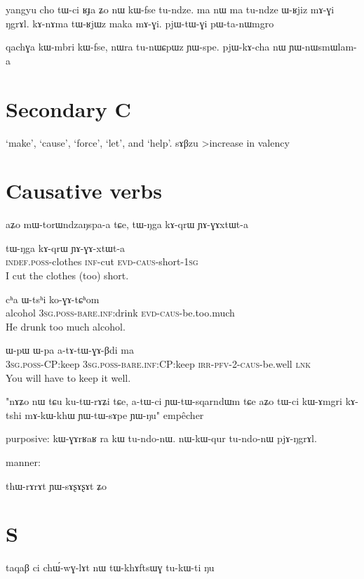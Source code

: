 \documentclass[oldfontcommands,oneside,a4paper,11pt]{article}
\newcommand{\ipa}[1]{{\phon #1}} %
\begin{document}
yangyu cho tɯ-ci ʁɟa ʑo nɯ kɯ-fse tu-ndze.
ma nɯ ma tu-ndze ɯ-ʁjiz mɤ-ɣi ŋgrɤl.
kɤ-nɤma tɯ-ʁjɯz maka mɤ-ɣi.
pjɯ-tɯ-ɣi pɯ-ta-nɯmgro

qachɣa kɯ-mbri kɯ-fse, nɯra tu-nɯɕpɯz ɲɯ-spe. 
pjɯ-kɤ-cha nɯ ɲɯ-nɯsmɯlam-a
  \section{Secondary C} 
‘make’, ‘cause’, ‘force’, ‘let’, and ‘help’.
sɤβzu
>increase in valency
\section{Causative verbs}
aʑo mɯ-torɯndzaŋspa-a tɕe, tɯ-ŋga kɤ-qrɯ ɲɤ-ɣɤxtɯt-a



 \begin{exe}
\ex \label{ex:GAxtWt}
\gll
\ipa{tɯ-ŋga}  	\ipa{kɤ-qrɯ}  	\ipa{ɲɤ-ɣɤ-xtɯt-a}  \\
\textsc{indef.poss}-clothes \textsc{inf}-cut \textsc{evd-caus}-short-\textsc{1sg}\\
 \glt I cut the clothes (too) short.
\end{exe}

 \begin{exe}
\ex \label{ex:koGAtChom}
\gll
\ipa{cʰa} \ipa{ɯ-tsʰi} \ipa{ko-ɣɤ-tɕʰom} \\
alcohol \textsc{3sg.poss}-\textsc{bare.inf}:drink \textsc{evd-caus}-be.too.much \\
\glt He drunk too much alcohol.
\end{exe}
 \begin{exe}
\ex \label{ex:atAtWGABdi}
\gll
\ipa{ɯ-pɯ}  	\ipa{ɯ-pa}  	\ipa{a-tɤ-tɯ-ɣɤ-βdi}  	\ipa{ma}  \\
\textsc{3sg.poss}-CP:keep \textsc{3sg.poss}-\textsc{bare.inf}:CP:keep \textsc{irr-pfv-2-caus}-be.well \textsc{lnk} \\
\glt You will have to keep it well.
\end{exe}


"nɤʑo nɯ tɕu ku-tɯ-rɤʑi tɕe, a-tɯ-ci ɲɯ-tɯ-sqarndɯm tɕe aʑo
tɯ-ci kɯ-ɤmgri kɤ-tshi mɤ-kɯ-khɯ ɲɯ-tɯ-sɤpe ɲɯ-ŋu"
empêcher

purposive:
kɯ-ɣɤrʁaʁ ra kɯ tu-ndo-nɯ.
nɯ-kɯ-qur tu-ndo-nɯ pjɤ-ŋgrɤl.

  
 
manner:

thɯ-rɤrɤt ɲɯ-sɤʂɤʂɤt ʑo

\section{S}

\ipa{taqaβ} 	\ipa{ci} 	\ipa{chɯ́-wɣ-lɤt} 	\ipa{nɯ} 	\ipa{tɯ-khɤftsɯɣ} 	\ipa{tu-kɯ-ti} 	\ipa{ŋu} 




\end{document}
